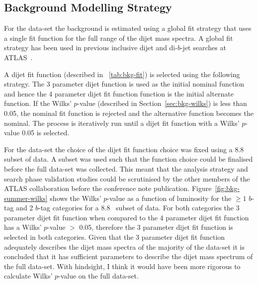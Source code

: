 \subsection{Background Modelling Strategy}
\label{sec:bkg-summer_global}

For the \summer{} data-set the background is estimated using a global fit strategy that
uses a single fit function for the full range of the dijet mass spectra.
A global fit strategy has been used in previous inclusive dijet and di-$b$-jet searches at ATLAS~\cite{dijet-mori16_paper,dibjet-mori16_paper}.

A dijet fit function (described in ~\ref{tab:bkg-fit}) is selected using the following strategy.
The 3 parameter dijet function is used as the initial nominal function and hence the 4 parameter dijet fit function function is the initial alternate function.
If the Wilks' \mbox{$p$-value} (described in Section~\ref{sec:bkg-wilks}) is less than 0.05,
the nominal fit function is rejected and the alternative function becomes the nominal.
The process is iteratively run until a dijet fit function with a Wilks' \mbox{$p$-value} \gt{} 0.05 is selected.

For the \summer{} data-set the choice of the dijet fit function choice was fixed using a 8.8~\ifb{} subset of data.
A subset was used such that the function choice could be finalised before the full data-set was collected.
This meant that the analysis strategy and search phase validation studies could be scrutinised by the other members of the ATLAS collaboration before the conference note publication.
Figure~\ref{fig:bkg-summer-wilks} shows the Wilks' \mbox{$p$-value} as a function of luminosity
for the $\geq1$ $b$-tag and 2 $b$-tag categories for a 8.8~\ifb{} subset of data.
For both categories the 3 parameter dijet fit function when compared to the 4 parameter dijet fit function
has a Wilks' \mbox{$p$-value} $>$ 0.05,
therefore the 3 parameter dijet fit function is selected in both categories.
Given that the 3 parameter dijet fit function adequately describes the dijet mass spectra of the
majority of the data-set it is concluded that it has sufficient parameters to describe the dijet mass spectrum of the full data-set.
With hindsight, I think it would have been more rigorous to calculate Wilks' \mbox{$p$-value} on the full data-set.

